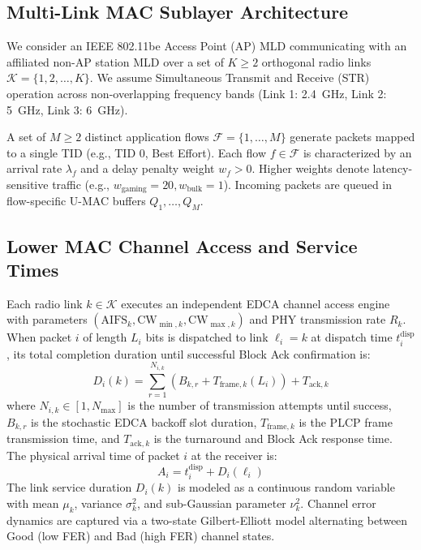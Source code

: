 \documentclass[10pt,journal,compsoc]{IEEEtran}
\begin{document}
\subsection{Multi-Link MAC Sublayer Architecture}
We consider an IEEE 802.11be Access Point (AP) MLD communicating with an affiliated non-AP station MLD over a set of $K \ge 2$ orthogonal radio links $\mathcal{K} = \{1, 2, \dots, K\}$. We assume Simultaneous Transmit and Receive (STR) operation across non-overlapping frequency bands (Link 1: 2.4~GHz, Link 2: 5~GHz, Link 3: 6~GHz).

A set of $M \ge 2$ distinct application flows $\mathcal{F} = \{1, \dots, M\}$ generate packets mapped to a single TID (e.g., TID 0, Best Effort). Each flow $f \in \mathcal{F}$ is characterized by an arrival rate $\lambda_f$ and a delay penalty weight $w_f > 0$. Higher weights denote latency-sensitive traffic (e.g., $w_{\text{gaming}} = 20, w_{\text{bulk}} = 1$). Incoming packets are queued in flow-specific U-MAC buffers $Q_1, \dots, Q_M$.

\subsection{Lower MAC Channel Access and Service Times}
Each radio link $k \in \mathcal{K}$ executes an independent EDCA channel access engine with parameters $(\text{AIFS}_k, \text{CW}_{\min, k}, \text{CW}_{\max, k})$ and PHY transmission rate $R_k$. When packet $i$ of length $L_i$ bits is dispatched to link $\ell_i = k$ at dispatch time $t_i^{\text{disp}}$, its total completion duration until successful Block Ack confirmation is:
\begin{equation}
    D_i(k) = \sum_{r=1}^{N_{i, k}} \left( B_{k, r} + T_{\text{frame}, k}(L_i) \right) + T_{\text{ack}, k}
\end{equation}
where $N_{i, k} \in [1, N_{\max}]$ is the number of transmission attempts until success, $B_{k, r}$ is the stochastic EDCA backoff slot duration, $T_{\text{frame}, k}$ is the PLCP frame transmission time, and $T_{\text{ack}, k}$ is the turnaround and Block Ack response time. The physical arrival time of packet $i$ at the receiver is:
\begin{equation}
    A_i = t_i^{\text{disp}} + D_i(\ell_i)
\end{equation}
The link service duration $D_i(k)$ is modeled as a continuous random variable with mean $\mu_k$, variance $\sigma_k^2$, and sub-Gaussian parameter $\nu_k^2$. Channel error dynamics are captured via a two-state Gilbert-Elliott model alternating between Good (low FER) and Bad (high FER) channel states.
\end{document}
